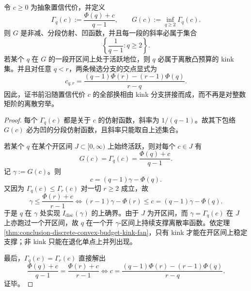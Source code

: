 \begin{corollary}[证书前沿关于置信代价的凹折线结构]\label{cor:conclusion-certificate-front-concave-polygonal-kink-support}
令 \(c\ge 0\) 为抽象置信代价，并定义
\[
\Gamma_q(c):=\frac{\Phi(q)+c}{q-1},
\qquad
G(c):=\inf_{q\ge 2}\Gamma_q(c).
\]
则 \(G\) 是非减、分段仿射、凹函数，并且每一段的斜率必属于集合
\[
\left\{\frac1{q-1}:q\ge 2\right\}.
\]
若某个 \(q\) 在 \(G\) 的一段开区间上处于活跃地位，则 \(q\) 必属于离散凸预算的 kink 集。并且对任意 \(q<r\)，两条候选分支的交点显式为
\[
c_{q,r}=
\frac{(q-1)\Phi(r)-(r-1)\Phi(q)}{r-q}.
\]
因此，证书前沿随置信代价 \(c\) 的全部换相由 kink 分支拼接而成，而不再是对整数矩阶的离散穷举。
\end{corollary}
\begin{proof}
每个 \(\Gamma_q(c)\) 都是关于 \(c\) 的仿射函数，斜率为 \(1/(q-1)\)。故其下包络 \(G(c)\) 必为凹的分段仿射函数，且斜率只能取自上述集合。

若某个 \(q\) 在某个开区间 \(J\subset[0,\infty)\) 上始终活跃，则对每个 \(c\in J\) 有
\[
G(c)=\Gamma_q(c)=\frac{\Phi(q)+c}{q-1}.
\]
记 \(\gamma:=G(c)\)。则
\[
c=(q-1)\gamma-\Phi(q).
\]
又因为 \(\Gamma_q(c)\le \Gamma_r(c)\) 对一切 \(r\ge 2\) 成立，故
\[
\gamma\le \frac{\Phi(r)+c}{r-1}
\iff
(r-1)\gamma-\Phi(r)\le c=(q-1)\gamma-\Phi(q).
\]
于是 \(q\) 在 \(\gamma\) 处实现 \(I_{\mathrm{disc}}(\gamma)\) 的上确界。由于 \(J\) 为开区间，而 \(\gamma=\Gamma_q(c)\) 在 \(J\) 上亦跑过一个开区间，故 \(q\) 在一个开 \(\gamma\)-区间上持续支撑离散率函数。依定理 \ref{thm:conclusion-discrete-convex-budget-kink-fan}，只有 kink 才能在开区间上稳定支撑；非 kink 只能在退化单点上并列出现。

最后，\(\Gamma_q(c)=\Gamma_r(c)\) 直接解出
\[
\frac{\Phi(q)+c}{q-1}=\frac{\Phi(r)+c}{r-1}
\iff
c=\frac{(q-1)\Phi(r)-(r-1)\Phi(q)}{r-q}.
\]
证毕。
\end{proof}


